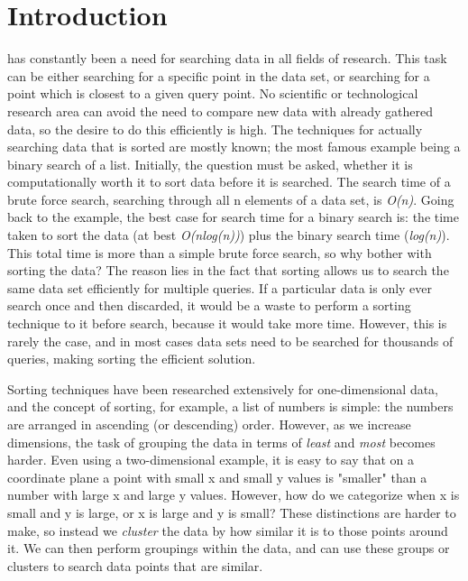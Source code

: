 \documentclass[journal]{IEEEtran}
\begin{document}
\section{Introduction}
% 
% 
% 
% 
 has constantly been a need for searching data in all fields of research. This task can be either searching for a specific point in the data set, or searching for a point which is closest to a given query point. No scientific or technological research area can avoid the need to compare new data with already gathered data, so the desire to do this efficiently is high. The techniques for actually searching data that is sorted are mostly known; the most famous example being a binary search of a list. Initially, the question must be asked, whether it is computationally worth it to sort data before it is searched. The search time of a brute force search, searching through all n elements of a data set, is \textit{O(n)}. Going back to the example, the best case for search time for a binary search is: the time taken to sort the data (at best \textit{O(nlog(n))}) plus the binary search time (\textit{log(n)}). This total time is more than a simple brute force search, so why bother with sorting the data? The reason lies in the fact that sorting allows us to search the same data set efficiently for multiple queries. If a particular data is only ever search once and then discarded, it would be a waste to perform a sorting technique to it before search, because it would take more time. However, this is rarely the case, and in most cases data sets need to be searched for thousands of queries, making sorting the efficient solution.\par

Sorting techniques have been researched extensively for one-dimensional data, and the concept of sorting, for example, a list of numbers is simple: the numbers are arranged in ascending (or descending) order. However, as we increase dimensions, the task of grouping the data in terms of \textit{least} and \textit{most} becomes harder. Even using a two-dimensional example, it is easy to say that on a coordinate plane a point with small x and small y values is "smaller" than a number with large x and large y values. However, how do we categorize when x is small and y is large, or x is large and y is small? These distinctions are harder to make, so instead we \textit{cluster} the data by how similar it is to those points around it. We can then perform groupings within the data, and can use these groups or clusters to search data points that are similar. \par
\end{document}
